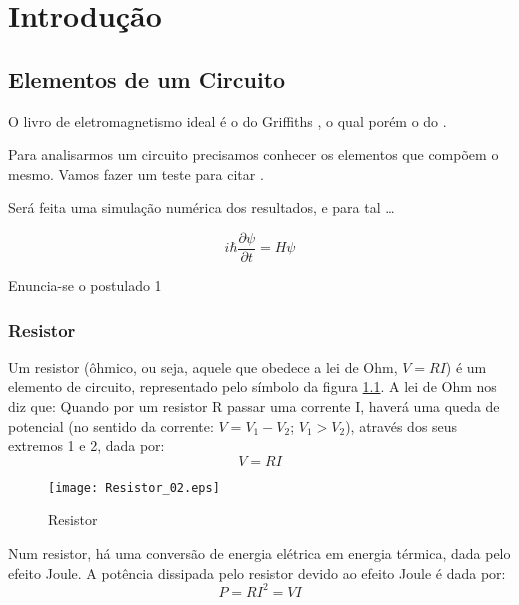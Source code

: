 \chapter{Introdução}

\section{Elementos de um Circuito}

O livro de eletromagnetismo ideal é o do Griffiths 
\cite{GriffithsEletro}, o qual porém o 
do \cite[ver pag.10]{Adams1992,Niguem2013}.

Para analisarmos\cite{Campos2001,Heath1997,Dahlquist1974} um circuito 
precisamos conhecer os elementos que compõem o
mesmo. Vamos fazer um teste para citar \cite{Tort2001,Adams1992}.

Será feita uma simulação numérica\cite{Conte1980} dos resultados, e
para tal \ldots

\begin{equation}\label{eq:Sch} 
   i \hbar \dfrac{\partial \psi}{\partial t} = H \psi
\end{equation} 

\begin{postulado}
   Enuncia-se o postulado 1
\end{postulado}


\subsection{Resistor}

Um resistor (ôhmico, ou seja, aquele que obedece a lei de Ohm, $V=RI$)
é um elemento de circuito, representado pelo símbolo da figura 
\ref{fig:Resistor}. A lei de Ohm nos diz que: Quando por um resistor R passar
uma corrente I, haverá uma queda de potencial (no sentido da corrente:
$V=V_{1}-V_{2}$; $V_{1}>V_{2}$), através dos seus extremos 1 e 2, dada
por:
\begin{equation*}
V=RI
\end{equation*}

\begin{figure}[!h]
\begin{center}
\texttt{[image: Resistor\_02.eps]}
\end{center}
\caption{Resistor}
\label{fig:Resistor}
\end{figure}


Num resistor, há uma conversão de energia elétrica em energia
térmica, dada pelo efeito Joule. A potência dissipada pelo resistor
devido ao efeito Joule é dada por\cite{RLandau97,DeVries93}:
\begin{equation*}
P=RI^{2}=VI
\end{equation*}


